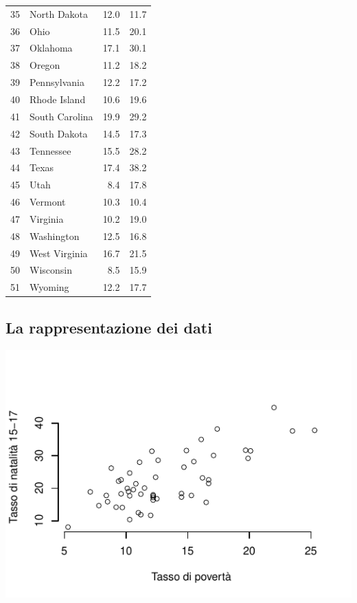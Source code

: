 \documentclass[
  11pt,
]{book}
\theoremstyle{mytheoremstyle}
\theoremstyle{mydefstyle}
\begin{document}
\begin{table}[H]
\begin{tabular}{rlrr}
35 & North Dakota & 12.0 & 11.7\\
36 & Ohio & 11.5 & 20.1\\
37 & Oklahoma & 17.1 & 30.1\\
38 & Oregon & 11.2 & 18.2\\
39 & Pennsylvania & 12.2 & 17.2\\
40 & Rhode Island & 10.6 & 19.6\\
41 & South Carolina & 19.9 & 29.2\\
42 & South Dakota & 14.5 & 17.3\\
43 & Tennessee & 15.5 & 28.2\\
44 & Texas & 17.4 & 38.2\\
45 & Utah & 8.4 & 17.8\\
46 & Vermont & 10.3 & 10.4\\
47 & Virginia & 10.2 & 19.0\\
48 & Washington & 12.5 & 16.8\\
49 & West Virginia & 16.7 & 21.5\\
50 & Wisconsin & 8.5 & 15.9\\
51 & Wyoming & 12.2 & 17.7\\
\bottomrule
\end{tabular}
\end{table}

\subsection{La rappresentazione dei dati}\label{la-rappresentazione-dei-dati}

\begin{center}\includegraphics{Esami_passati_con_soluzioni_files/figure-latex/06-regr-45-1} \end{center}
\end{document}

